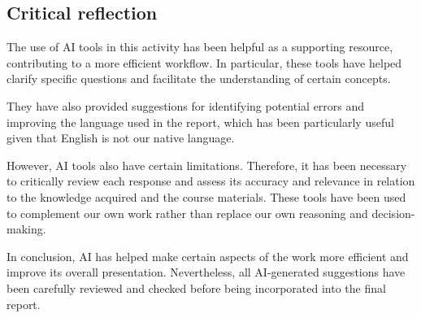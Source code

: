 \documentclass[a4paper,10pt]{article}\usepackage[]{graphicx}\usepackage[]{xcolor}
\begin{document}
\subsection*{Critical reflection}


The use of AI tools in this activity has been helpful as a supporting resource, contributing to a more efficient workflow. In particular, these tools have helped clarify specific questions and facilitate the understanding of certain concepts.

They have also provided suggestions for identifying potential errors and improving the language used in the report, which has been particularly useful given that English is not our native language.

However, AI tools also have certain limitations. Therefore, it has been necessary to critically review each response and assess its accuracy and relevance in relation to the knowledge acquired and the course materials. These tools have been used to complement our own work rather than replace our own reasoning and decision-making.

In conclusion, AI has helped make certain aspects of the work more efficient and improve its overall presentation. Nevertheless, all AI-generated suggestions have been carefully reviewed and checked before being incorporated into the final report.
\end{document}
